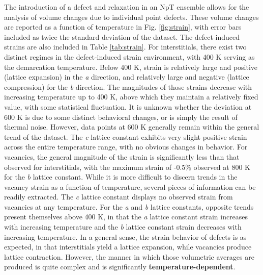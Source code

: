 \documentclass[utf8]{frontiersSCNS} %
\providecommand{\DIFaddtex}[1]{{\bf #1}} %
\providecommand{\DIFdeltex}[1]{} %
\providecommand{\DIFaddbegin}{\protect\color{blue}} %
\providecommand{\DIFaddend}{\protect\color{black}} %
\providecommand{\DIFdelbegin}{\protect\color{red}} %
\providecommand{\DIFdelend}{\protect\color{black}} %
\providecommand{\DIFadd}[1]{\texorpdfstring{\DIFaddtex{#1}}{#1}} %
\providecommand{\DIFdel}[1]{\texorpdfstring{\DIFdeltex{#1}}{}} %
\begin{document}
The introduction of a defect and relaxation in an NpT ensemble allows for the analysis of volume changes due to individual point defects. These volume changes are reported as a function of temperature in Fig. \ref{fig:strain}, with error bars included as twice the standard deviation of the dataset. The defect-induced strains are also included in Table \ref{tab:strain}. For interstitials, there \DIFdelbegin \DIFdel{clearly }\DIFdelend exist two distinct regimes in the defect-induced strain environment, with 400 K serving as the demarcation temperature. Below 400 K, strain is relatively large and positive (lattice expansion) in the \textit{a} direction, and relatively large and negative (lattice compression) for the \textit{b} direction. The magnitudes of those strains decrease with increasing temperature up to 400 K, above which they maintain a relatively fixed value, with some statistical fluctuation. It is unknown whether the deviation at 600 K is due to some distinct behavioral changes, or is simply the result of thermal noise. However, data points at 600 K generally remain within the general trend of the dataset. The \textit{c} lattice constant exhibits very slight positive strain across the entire temperature range, with no obvious changes in behavior. For vacancies, the general magnitude of the strain is significantly less than that observed for interstitials, with the maximum strain of -0.5\% observed at 800 K for the \textit{b} lattice constant. While it is more difficult to discern trends in the vacancy strain as a function of temperature, several pieces of information can be readily extracted. The \textit{c} lattice constant displays no observed strain from vacancies at any temperature. For the \textit{a} and \textit{b} lattice constants, opposite trends present themselves above 400 K, in that the \textit{a} lattice constant strain increases with increasing temperature and the \textit{b} lattice constant strain decreases with increasing temperature. In a general sense, the strain behavior of defects is as expected, in that interstitials yield a lattice expansion, while vacancies produce lattice contraction. However, the manner in which those volumetric averages are produced is quite complex \DIFdelbegin \DIFdel{, }\DIFdelend and is significantly \DIFdelbegin \DIFdel{temperature dependent}\DIFdelend \DIFaddbegin \DIFadd{temperature-dependent}\DIFaddend . 
\end{document}
